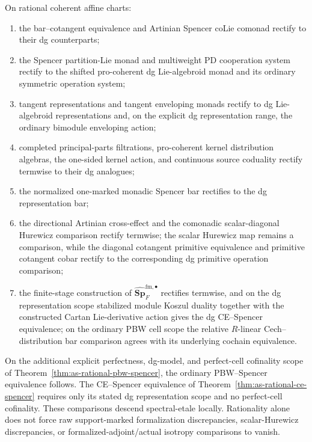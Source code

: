\begin{theorem}
\label{thm:as-rational-spencer-rectification}
On rational coherent affine charts:
\begin{enumerate}
    \item the bar--cotangent equivalence and Artinian Spencer coLie comonad
    rectify to their dg counterparts;
    \item the Spencer partition-Lie monad and multiweight PD cooperation
    system rectify to the shifted pro-coherent dg Lie-algebroid monad and its
    ordinary symmetric operation system;
    \item tangent representations and tangent enveloping monads rectify to dg
    Lie-algebroid representations and, on the explicit dg representation
    range, the ordinary bimodule enveloping action;
    \item completed principal-parts filtrations, pro-coherent kernel
    distribution algebras, the one-sided kernel action, and continuous source
    coduality rectify termwise to their dg analogues;
    \item the normalized one-marked monadic Spencer bar rectifies to the dg
    representation bar;
    \item the directional Artinian cross-effect and the comonadic
    scalar-diagonal Hurewicz comparison rectify termwise; the scalar Hurewicz
    map remains a comparison, while the diagonal cotangent primitive
    equivalence and primitive cotangent cobar rectify to the corresponding dg
    primitive operation comparison;
    \item the finite-stage construction of
    $\widehat{\mathbf{Sp}}_{F}^{\mathrm{fm},\bullet}$ rectifies termwise, and
    on the dg representation scope stabilized module Koszul duality together with
    the constructed Cartan Lie-derivative action gives the dg CE--Spencer
    equivalence; on the ordinary PBW cell scope the relative $R$-linear
    Cech--distribution bar comparison agrees with its underlying cochain
    equivalence.
\end{enumerate}
On the additional explicit perfectness, dg-model, and perfect-cell cofinality
scope of Theorem~\ref{thm:as-rational-pbw-spencer}, the ordinary
PBW--Spencer equivalence follows.  The CE--Spencer equivalence of
Theorem~\ref{thm:as-rational-ce-spencer} requires only its stated dg
representation scope and no perfect-cell cofinality.  These comparisons
descend spectral-etale locally.
Rationality alone does not force raw support-marked formalization
discrepancies, scalar-Hurewicz discrepancies, or formalized-adjoint/actual
isotropy comparisons to vanish.
\end{theorem}


